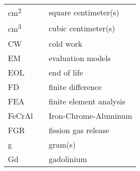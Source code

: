 \begin{ThreePartTable}
\begin{longtable}{l l l}
        cm\textsuperscript{2}       &      \hspace{0.25in}     &         square centimeter(s)                               \\
        
        cm\textsuperscript{3}       &      \hspace{0.25in}     &         cubic centimeter(s)                                \\
        
        CW                          &      \hspace{0.25in}     &         cold work                                          \\
        
        EM                          &      \hspace{0.25in}     &         evaluation models                                  \\
        
        EOL                         &      \hspace{0.25in}     &         end of life                                        \\
        
        FD                          &      \hspace{0.25in}     &         finite difference                                  \\
        
        FEA                         &      \hspace{0.25in}     &         finite element analysis                            \\
        
        FeCrAl                      &      \hspace{0.25in}     &         Iron-Chrome-Aluminum                               \\
        
        FGR                         &      \hspace{0.25in}     &         fission gas release                                \\
        
        g                           &      \hspace{0.25in}     &         gram(s)                                            \\
        
        Gd                          &      \hspace{0.25in}     &         gadolinium                                         \\
        

\end{longtable}
\end{ThreePartTable}
